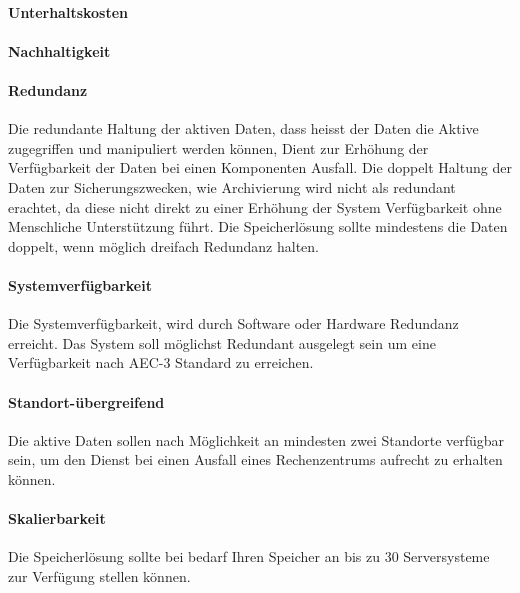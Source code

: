 \paragraph{Unterhaltskosten}\label{Soll-1-2}

\paragraph{Nachhaltigkeit}\label{Soll-1-3}

\setcounter{paragraph}{0}
\renewcommand\theparagraph{Soll-2-\arabic{paragraph}}

\paragraph{Redundanz}\label{Soll-2-1}
Die redundante Haltung der aktiven Daten, dass heisst der Daten die Aktive zugegriffen und manipuliert werden können, Dient zur Erhöhung der Verfügbarkeit der Daten bei einen Komponenten Ausfall. Die doppelt Haltung der Daten zur Sicherungszwecken, wie Archivierung wird nicht als redundant erachtet, da diese nicht direkt zu einer Erhöhung der System Verfügbarkeit ohne Menschliche Unterstützung führt. Die Speicherlösung sollte mindestens die Daten doppelt, wenn möglich dreifach Redundanz halten. 


\paragraph{Systemverfügbarkeit}\label{Soll-2-2}
Die Systemverfügbarkeit, wird durch Software oder Hardware Redundanz erreicht. Das System soll möglichst Redundant ausgelegt sein um eine Verfügbarkeit nach AEC-3 Standard zu erreichen.

\paragraph{Standort-übergreifend}\label{Soll-2-3}
Die aktive Daten sollen nach Möglichkeit an mindesten zwei Standorte verfügbar sein, um den Dienst bei einen Ausfall eines Rechenzentrums aufrecht zu erhalten können.

\setcounter{paragraph}{0}
\renewcommand\theparagraph{Soll-3-\arabic{paragraph}}

\paragraph{Skalierbarkeit}\label{Soll-3-1}
Die Speicherlösung sollte bei bedarf Ihren Speicher an bis zu 30 Serversysteme zur Verfügung stellen können.


